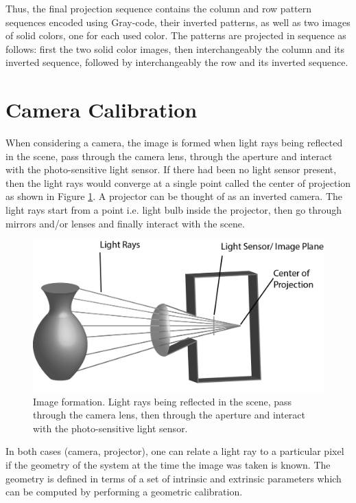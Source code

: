 \documentclass[final,12pt,3p]{elsarticle}
\begin{document}
Thus, the final projection sequence contains the column and row pattern sequences encoded using Gray-code, their inverted patterns, as well as two images of solid colors, one for each used color. The patterns are projected in sequence as follows: first the two solid color images, then interchangeably the column and its inverted sequence, followed by interchangeably the row and its inverted sequence.

\section{Camera Calibration}
\label{sec:calib}

When considering a camera, the image is formed when light rays being reflected in the scene, pass through the camera lens, through the aperture and interact with the photo-sensitive light sensor. If there had been no light sensor present, then the light rays would converge at a single point called the center of projection as shown in Figure \ref{fig:camRays}. A projector can be thought of as an inverted camera. The light rays start from a point i.e. light bulb inside the projector, then go through mirrors and/or lenses and finally interact with the scene.

\begin{figure}[!ht]
	\centering
	\includegraphics[scale=0.8]{./images/rays_and_camera.png}
	\caption{\label{fig:camRays} Image formation. Light rays being reflected in the scene, pass through the camera lens, then through the aperture and interact with the photo-sensitive light sensor.}
\end{figure}

In both cases (camera, projector), one can relate a light ray to a particular pixel if the geometry of the system at the time the image was taken is known. The geometry is defined in terms of a set of intrinsic and extrinsic parameters which can be computed by performing a geometric calibration.
\end{document}
